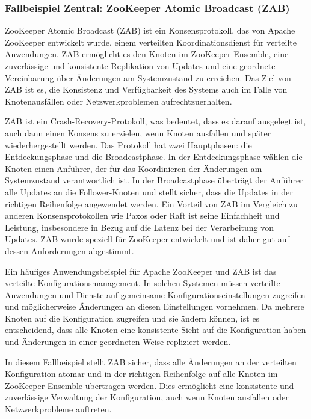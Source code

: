 \subsubsection{Fallbeispiel Zentral: ZooKeeper Atomic Broadcast (ZAB)}

ZooKeeper Atomic Broadcast (ZAB) ist ein Konsensprotokoll, das von Apache ZooKeeper entwickelt wurde, einem verteilten Koordinationsdienst für verteilte Anwendungen. ZAB ermöglicht es den Knoten im ZooKeeper-Ensemble, eine zuverlässige und konsistente Replikation von Updates und eine geordnete Vereinbarung über Änderungen am Systemzustand zu erreichen. Das Ziel von ZAB ist es, die Konsistenz und Verfügbarkeit des Systems auch im Falle von Knotenausfällen oder Netzwerkproblemen aufrechtzuerhalten.

ZAB ist ein Crash-Recovery-Protokoll, was bedeutet, dass es darauf ausgelegt ist, auch dann einen Konsens zu erzielen, wenn Knoten ausfallen und später wiederhergestellt werden. Das Protokoll hat zwei Hauptphasen: die Entdeckungsphase und die Broadcastphase. In der Entdeckungsphase wählen die Knoten einen Anführer, der für das Koordinieren der Änderungen am Systemzustand verantwortlich ist. In der Broadcastphase überträgt der Anführer alle Updates an die Follower-Knoten und stellt sicher, dass die Updates in der richtigen Reihenfolge angewendet werden.
Ein Vorteil von ZAB im Vergleich zu anderen Konsensprotokollen wie Paxos oder Raft ist seine Einfachheit und Leistung, insbesondere in Bezug auf die Latenz bei der Verarbeitung von Updates. ZAB wurde speziell für ZooKeeper entwickelt und ist daher gut auf dessen Anforderungen abgestimmt.

Ein häufiges Anwendungsbeispiel für Apache ZooKeeper und ZAB ist das verteilte Konfigurationsmanagement. In solchen Systemen müssen verteilte Anwendungen und Dienste auf gemeinsame Konfigurationseinstellungen zugreifen und möglicherweise Änderungen an diesen Einstellungen vornehmen. Da mehrere Knoten auf die Konfiguration zugreifen und sie ändern können, ist es entscheidend, dass alle Knoten eine konsistente Sicht auf die Konfiguration haben und Änderungen in einer geordneten Weise repliziert werden.

In diesem Fallbeispiel stellt ZAB sicher, dass alle Änderungen an der verteilten Konfiguration atomar und in der richtigen Reihenfolge auf alle Knoten im ZooKeeper-Ensemble übertragen werden. Dies ermöglicht eine konsistente und zuverlässige Verwaltung der Konfiguration, auch wenn Knoten ausfallen oder Netzwerkprobleme auftreten.

